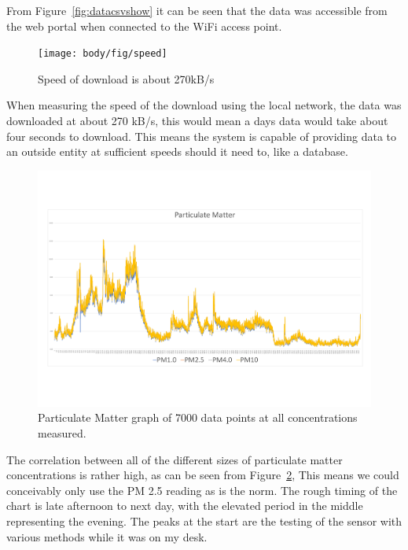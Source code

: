 \noindent
From Figure~\ref{fig:datacsvshow} it can be seen that the data was accessible from the web portal when connected to the WiFi access point.
\pagebreak

\begin{figure}[!htb]
	\centering
	\texttt{[image: body/fig/speed]}
	\caption{Speed of download is about 270kB/s }
	\label{fig:speed}
\end{figure}

\noindent
When measuring the speed of the download using the local network, the data was downloaded at about 270 kB/s, this would mean a days data would take about four seconds to download. This means the system is capable of providing data to an outside entity at sufficient speeds should it need to, like a database.



\begin{figure}[!htb]
	\centering
	\includegraphics[width=0.9\linewidth]{body/fig/PMall.pdf}
	\caption{Particulate Matter graph of 7000 data points at all concentrations measured.}
	\label{fig:PMall}
\end{figure}

\noindent
The correlation between all of the different sizes of particulate matter concentrations is rather high, as can be seen from Figure~\ref{fig:PMall}, This means we could conceivably only use the PM 2.5 reading as is the norm. The rough timing of the chart is late afternoon to next day, with the elevated period in the middle representing the evening.
The peaks at the start are the testing of the sensor with various methods while it was on my desk.

